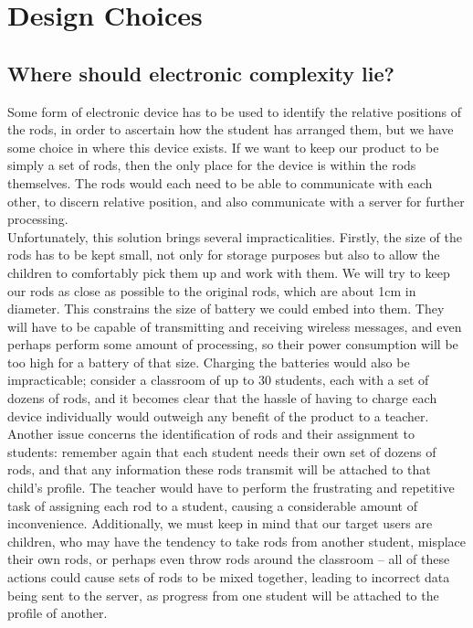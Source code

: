 \chapter{Design Choices}


\section{Where should electronic complexity lie?}
\label{sec:complexity}

Some form of electronic device has to be used to identify the relative positions of the rods, in order to ascertain how the student has arranged them, but we have some choice in where this device exists. If we want to keep our product to be simply a set of rods, then the only place for the device is within the rods themselves. The rods would each need to be able to communicate with each other, to discern relative position, and also communicate with  a server for further processing.\\

Unfortunately, this solution brings several impracticalities. Firstly, the size of the rods has to be kept small, not only for storage purposes but also to allow the children to comfortably pick them up and work with them. We will try to keep our rods as close as possible to the original rods, which are about 1cm in diameter. This constrains the size of battery we could embed into them. They will have to be capable of transmitting and receiving wireless messages, and even perhaps perform some amount of processing, so their power consumption will be too high for a battery of that size. Charging the batteries would also be impracticable; consider a classroom of up to 30 students, each with a set of dozens of rods, and it becomes clear that the hassle of having to charge each device individually would outweigh any benefit of the product to a teacher.\\

Another issue concerns the identification of rods and their assignment to students: remember again that each student needs their own set of dozens of rods, and that any information these rods transmit will be attached to that child’s profile. The teacher would have to perform the frustrating and repetitive task of assigning each rod to a student, causing a considerable amount of inconvenience. Additionally, we must keep in mind that our target users are children, who may have the tendency to take rods from another student, misplace their own rods, or perhaps even throw rods around the classroom – all of these actions could cause sets of rods to be mixed together, leading to incorrect data being sent to the server, as progress from one student will be attached to the profile of another.\\

